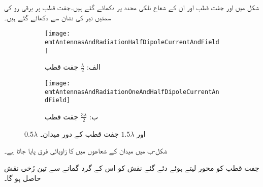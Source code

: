 شکل  میں  اور  جفت قطب اور ان کے شعاع نلکی محدد پر دکھائے گئے ہیں۔جفت قطب پر برقی رو کی سمتیں تیر کی نشان سے دکھائے گئے ہیں۔

\begin{figure}
\centering
\begin{subfigure}{0.4\textwidth}
\centering
\texttt{[image: emtAntennasAndRadiationHalfDipoleCurrentAndField]}
\caption*{الف: $\frac{\lambda}{2}$ جفت قطب}
\end{subfigure}%
%
\begin{subfigure}{0.4\textwidth}
\centering
\texttt{[image: emtAntennasAndRadiationOneAndHalfDipoleCurrentAndField]}
\caption*{ب: $\frac{3\lambda}{2}$ جفت قطب}
\end{subfigure}%
\caption{$0.5\lambda$ اور $1.5\lambda$ جفت قطب کے دور میدان۔}
\label{شکل_اینٹینا_نصف_جفت_قطب_برقی_رو}
\end{figure}%

شکل-ب میں میدان کے شعاعوں میں  کا زاویائی فرق پایا جاتا ہے۔

جفت قطب کو محور لیتے ہوئے دئے گئے نقش کو اس کے گرد گمانے سے تین رُخی نقش حاصل ہو گا۔ 

